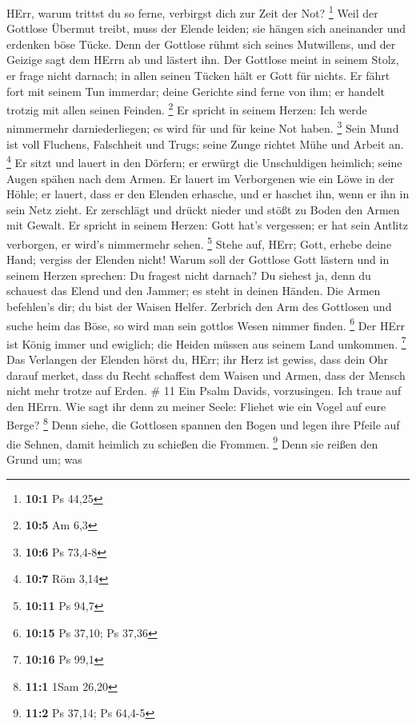  HErr, warum trittst du so ferne, verbirgst dich zur Zeit
der Not? \footnote{\textbf{10:1} Ps 44,25}  Weil der
Gottlose Übermut treibt, muss der Elende leiden; sie hängen sich
aneinander und erdenken böse Tücke.  Denn der Gottlose rühmt
sich seines Mutwillens, und der Geizige sagt dem HErrn ab und lästert
ihn.  Der Gottlose meint in seinem Stolz, er frage nicht
darnach; in allen seinen Tücken hält er Gott für nichts.  Er
fährt fort mit seinem Tun immerdar; deine Gerichte sind ferne von ihm;
er handelt trotzig mit allen seinen Feinden. \footnote{\textbf{10:5} Am
  6,3}  Er spricht in seinem Herzen: Ich werde nimmermehr
darniederliegen; es wird für und für keine Not haben. \footnote{\textbf{10:6}
  Ps 73,4-8}  Sein Mund ist voll Fluchens, Falschheit und
Trugs; seine Zunge richtet Mühe und Arbeit an. \footnote{\textbf{10:7}
  Röm 3,14}  Er sitzt und lauert in den Dörfern; er erwürgt
die Unschuldigen heimlich; seine Augen spähen nach dem Armen.
 Er lauert im Verborgenen wie ein Löwe in der Höhle; er
lauert, dass er den Elenden erhasche, und er haschet ihn, wenn er ihn in
sein Netz zieht.  Er zerschlägt und drückt nieder und stößt
zu Boden den Armen mit Gewalt.  Er spricht in seinem
Herzen: Gott hat's vergessen; er hat sein Antlitz verborgen, er wird's
nimmermehr sehen. \footnote{\textbf{10:11} Ps 94,7}  Stehe
auf, HErr; Gott, erhebe deine Hand; vergiss der Elenden nicht!
 Warum soll der Gottlose Gott lästern und in seinem Herzen
sprechen: Du fragest nicht darnach?  Du siehest ja, denn du
schauest das Elend und den Jammer; es steht in deinen Händen. Die Armen
befehlen's dir; du bist der Waisen Helfer.  Zerbrich den
Arm des Gottlosen und suche heim das Böse, so wird man sein gottlos
Wesen nimmer finden. \footnote{\textbf{10:15} Ps 37,10; Ps 37,36}
 Der HErr ist König immer und ewiglich; die Heiden müssen
aus seinem Land umkommen. \footnote{\textbf{10:16} Ps 99,1}
 Das Verlangen der Elenden hörst du, HErr; ihr Herz ist
gewiss, dass dein Ohr darauf merket,  dass du Recht
schaffest dem Waisen und Armen, dass der Mensch nicht mehr trotze auf
Erden. \# 11  Ein Psalm Davids, vorzusingen. Ich traue auf
den HErrn. Wie sagt ihr denn zu meiner Seele: Fliehet wie ein Vogel auf
eure Berge? \footnote{\textbf{11:1} 1Sam 26,20}  Denn siehe,
die Gottlosen spannen den Bogen und legen ihre Pfeile auf die Sehnen,
damit heimlich zu schießen die Frommen. \footnote{\textbf{11:2} Ps
  37,14; Ps 64,4-5}  Denn sie reißen den Grund um; was
